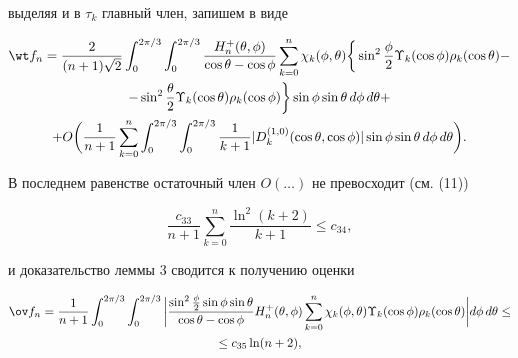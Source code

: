 выделяя и в $\tau_k$ главный член, запишем в виде


\begin{multline}


\wt f_n =\frac{2}{(n+1)\sqrt 2}


\int_0^{{2\pi}/{3}} \int_0^{{2\pi}/{3}}


\frac{H^+_n (\theta, \phi)}{\cos\theta -\cos\phi}


\sum_{k=0}^n\chi_k(\phi,\theta)\bigg\{\sin^2\frac{\phi}{2}


\Upsilon_k(\cos\phi)\rho_k(\cos\theta)- \\


%


-\sin^2\frac{\theta}{2}


\Upsilon_k(\cos\theta)\rho_k(\cos\phi)\bigg\}


\sin\phi \sin\theta\, d\phi\, d\theta+ \\


%


+O\bigg(\frac{1}{n+1}\sum_{k=0}^n


\int_0^{{2\pi}/{3}} \int_0^{{2\pi}/{3}} \frac{1}{k+1}


|D_k^{(1,0)}(\cos \theta, \cos\phi)|\sin \phi


\sin\theta\, d\phi\, d\theta\bigg).


\end{multline}


В последнем равенстве остаточный член $O(\dotsc)$ не превосходит (см. (11))


$$


\frac{c_{33}}{n+1}\sum_{k=0}^n \frac{\ln^2(k+2)}{k+1}\le c_{34},


$$


и доказательство леммы 3 сводится к получению оценки


\begin{multline}


\ov f_n =\frac{1}{n+1}


\int_0^{{2\pi}/{3}} \int_0^{{2\pi}/{3}}


\bigg|\frac{\sin^2\frac{\phi}{2}\sin\phi\sin\theta}{\cos\theta-\cos\phi}


H^+_n (\theta, \phi)


\sum_{k=0}^n\chi_k(\phi,\theta)\Upsilon_k(\cos\phi)\rho_k(\cos\theta)


\bigg|d\phi\, d\theta \le \\


%


\le c_{35} \ln(n+2),


\end{multline}


